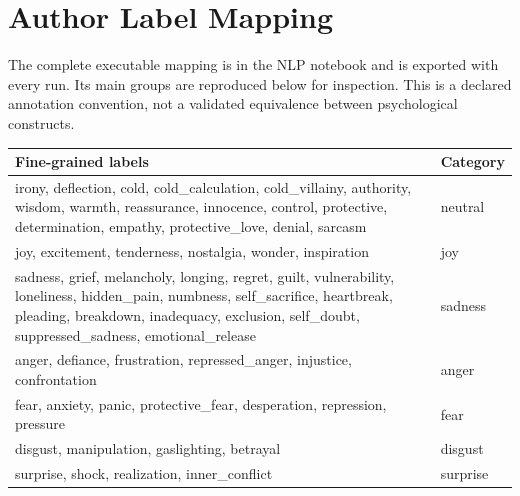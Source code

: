 \documentclass[10pt]{article}
\begin{document}
\appendix
\section{Author Label Mapping}
\label{app:mapping}
The complete executable mapping is in the NLP notebook and is exported with every
run. Its main groups are reproduced below for inspection. This is a declared
annotation convention, not a validated equivalence between psychological constructs.
\begin{table}[H]
\centering\footnotesize
\begin{tabular}{p{10cm}l}
\toprule Fine-grained labels & Category \\\midrule
irony, deflection, cold, cold\_calculation, cold\_villainy, authority, wisdom,
warmth, reassurance, innocence, control, protective, determination, empathy,
protective\_love, denial, sarcasm & neutral \\\midrule
joy, excitement, tenderness, nostalgia, wonder, inspiration & joy \\\midrule
sadness, grief, melancholy, longing, regret, guilt, vulnerability, loneliness,
hidden\_pain, numbness, self\_sacrifice, heartbreak, pleading, breakdown,
inadequacy, exclusion, self\_doubt, suppressed\_sadness, emotional\_release & sadness \\\midrule
anger, defiance, frustration, repressed\_anger, injustice, confrontation & anger \\\midrule
fear, anxiety, panic, protective\_fear, desperation, repression, pressure & fear \\\midrule
disgust, manipulation, gaslighting, betrayal & disgust \\\midrule
surprise, shock, realization, inner\_conflict & surprise \\\bottomrule
\end{tabular}
\end{table}
\end{document}
